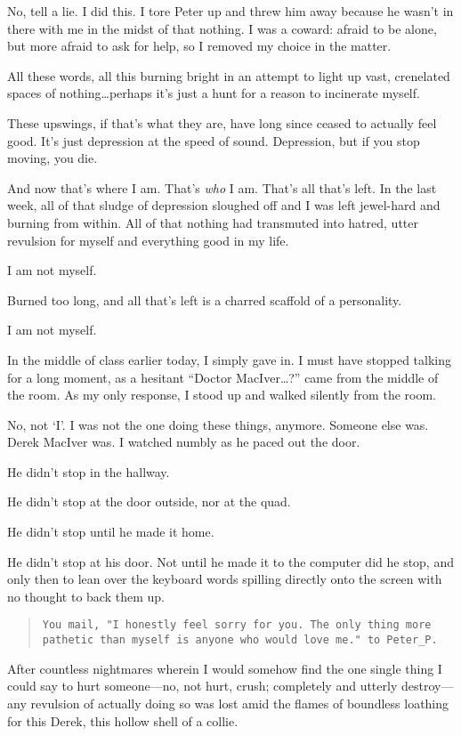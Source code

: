 No, tell a lie. I did this. I tore Peter up and threw him away because he wasn't in there with me in the midst of that nothing. I was a coward: afraid to be alone, but more afraid to ask for help, so I removed my choice in the matter.

All these words, all this burning bright in an attempt to light up vast, crenelated spaces of nothing\ldots{}perhaps it's just a hunt for a reason to incinerate myself.

\secdiv{}

\noindent These upswings, if that's what they are, have long since ceased to actually feel good. It's just depression at the speed of sound. Depression, but if you stop moving, you die.

And now that's where I am. That's \emph{who} I am. That's all that's left. In the last week, all of that sludge of depression sloughed off and I was left jewel-hard and burning from within. All of that nothing had transmuted into hatred, utter revulsion for myself and everything good in my life.

I am not myself.

Burned too long, and all that's left is a charred scaffold of a personality.

I am not myself.

In the middle of class earlier today, I simply gave in. I must have stopped talking for a long moment, as a hesitant ``Doctor MacIver\ldots{}?'' came from the middle of the room. As my only response, I stood up and walked silently from the room.

No, not `I'. I was not the one doing these things, anymore. Someone else was. Derek MacIver was. I watched numbly as he paced out the door.

He didn't stop in the hallway.

He didn't stop at the door outside, nor at the quad.

He didn't stop until he made it home.

He didn't stop at his door. Not until he made it to the computer did he stop, and only then to lean over the keyboard words spilling directly onto the screen with no thought to back them up.

\begin{verse}
\texttt{You mail, "I honestly feel sorry for you. The only thing more pathetic than myself is anyone who would love me." to Peter\_P.}
\end{verse}

After countless nightmares wherein I would somehow find the one single thing I could say to hurt someone---no, not hurt, crush; completely and utterly destroy---any revulsion of actually doing so was lost amid the flames of boundless loathing for this Derek, this hollow shell of a collie.

